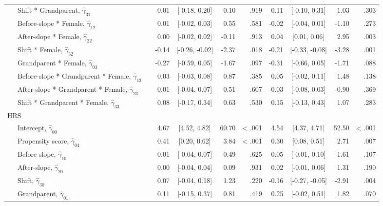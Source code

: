 \documentclass[
  english,
  man, noextraspace]{apa7}
\newenvironment{lltable}{\begin{landscape}\begin{center}\begin{ThreePartTable}}{\end{ThreePartTable}\end{center}\end{landscape}}
\begin{document}
\begin{appendix}
\begin{lltable}
{\begin{longtable}{lrcrrrcrr}
\ \ \ Shift * Grandparent, $\hat{\gamma}_{31}$ \textcolor{white}{L} & 0.01 & [-0.18, 0.20] & 0.10 & .919 & 0.11 & [-0.10, 0.31] & 1.03 & .303\\
\ \ \ Before-slope * Female, $\hat{\gamma}_{12}$ \textcolor{white}{L} & 0.01 & [-0.02, 0.03] & 0.55 & .581 & -0.02 & [-0.04, 0.01] & -1.10 & .273\\
\ \ \ After-slope * Female, $\hat{\gamma}_{22}$ \textcolor{white}{L} & 0.00 & [-0.02, 0.02] & -0.11 & .913 & 0.04 & [0.01, 0.06] & 2.95 & .003\\
\ \ \ Shift * Female, $\hat{\gamma}_{32}$ \textcolor{white}{L} & -0.14 & [-0.26, -0.02] & -2.37 & .018 & -0.21 & [-0.33, -0.08] & -3.28 & .001\\
\ \ \ Grandparent * Female, $\hat{\gamma}_{03}$ \textcolor{white}{L} & -0.27 & [-0.59, 0.05] & -1.67 & .097 & -0.31 & [-0.66, 0.05] & -1.71 & .088\\
\ \ \ Before-slope * Grandparent * Female, $\hat{\gamma}_{13}$ \textcolor{white}{L} & 0.03 & [-0.03, 0.08] & 0.87 & .385 & 0.05 & [-0.02, 0.11] & 1.48 & .138\\
\ \ \ After-slope * Grandparent * Female, $\hat{\gamma}_{23}$ \textcolor{white}{L} & 0.01 & [-0.04, 0.07] & 0.51 & .607 & -0.03 & [-0.08, 0.03] & -0.90 & .369\\
\ \ \ Shift * Grandparent * Female, $\hat{\gamma}_{33}$ \textcolor{white}{L} & 0.08 & [-0.17, 0.34] & 0.63 & .530 & 0.15 & [-0.13, 0.43] & 1.07 & .283\\
HRS &  &  &  &  &  &  &  & \\
\ \ \ Intercept, $\hat{\gamma}_{00}$ \textcolor{white}{H} & 4.67 & [4.52, 4.82] & 60.70 & < .001 & 4.54 & [4.37, 4.71] & 52.50 & < .001\\
\ \ \ Propensity score, $\hat{\gamma}_{04}$ \textcolor{white}{H} & 0.41 & [0.20, 0.62] & 3.84 & < .001 & 0.30 & [0.08, 0.51] & 2.71 & .007\\
\ \ \ Before-slope, $\hat{\gamma}_{10}$ \textcolor{white}{H} & 0.01 & [-0.04, 0.07] & 0.49 & .625 & 0.05 & [-0.01, 0.10] & 1.61 & .107\\
\ \ \ After-slope, $\hat{\gamma}_{20}$ \textcolor{white}{H} & 0.00 & [-0.04, 0.04] & 0.09 & .931 & 0.02 & [-0.01, 0.06] & 1.31 & .190\\
\ \ \ Shift, $\hat{\gamma}_{30}$ \textcolor{white}{H} & 0.07 & [-0.04, 0.18] & 1.23 & .220 & -0.16 & [-0.27, -0.05] & -2.91 & .004\\
\ \ \ Grandparent, $\hat{\gamma}_{01}$ \textcolor{white}{H} & 0.11 & [-0.15, 0.37] & 0.81 & .419 & 0.25 & [-0.02, 0.51] & 1.82 & .070\\

\end{longtable}}
\end{lltable}
\end{appendix}
\end{document}
